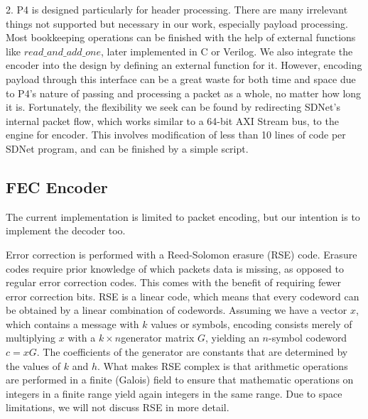 2. P4 is designed particularly for header processing. There are many
irrelevant  things not supported but
necessary in our work, especially payload processing. Most bookkeeping operations can be finished with the
help of external functions like $read\_and\_add\_one$, later implemented in C or Verilog. We also integrate the encoder
into the design by defining an external function for it. However, encoding payload through this interface can be a
great waste for both time and space due to P4's nature of passing and processing a packet as a whole, no matter how long it is. Fortunately, the
flexibility we seek can be found by redirecting SDNet's internal packet flow, which works similar to a 64-bit AXI Stream bus,
to the engine for encoder. This involves modification of less than 10 lines of code per SDNet program, and can be finished by a simple script.
\fi

\subsection{FEC Encoder}

The current implementation is limited to packet encoding, but our intention is
to implement the decoder too.

Error correction is performed with a Reed-Solomon erasure (RSE) code.  Erasure codes
require prior knowledge of which packets data is missing, as opposed to regular
error correction codes.  This comes with the benefit of requiring fewer error
correction bits.  RSE is a linear code, which means that every codeword can be
obtained by a linear combination of codewords.  Assuming we have a vector $x$,
which contains a message with $k$ values or symbols, encoding consists merely
of multiplying $x$ with a $k \times n$generator matrix $G$, yielding an $n$-symbol
codeword $c = xG$.  The coefficients of the
generator are constants that are determined by the values of $k$ and $h$.  What
makes RSE complex is that arithmetic operations are performed in a finite (Galois)
field to ensure that mathematic operations on integers in a finite range yield
again integers in the same range.  Due to space limitations, we will not discuss
RSE in more detail.

